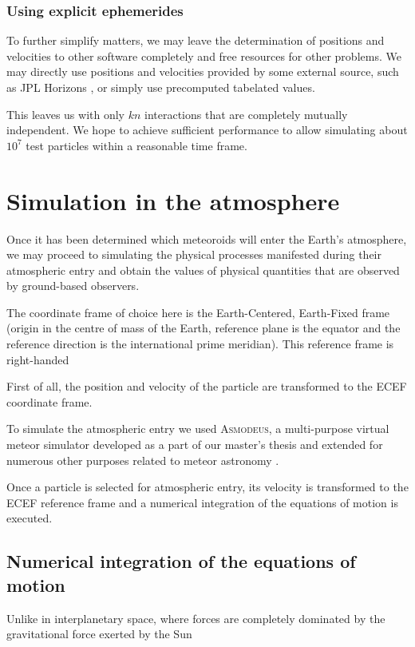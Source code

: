         \subsubsection{Using explicit ephemerides} \label{asie}
            To further simplify matters, we may leave the determination of positions and velocities
            to other software completely and free resources for other problems.
            We may directly use positions and velocities provided by some external source,
            such as JPL Horizons \cite{...}, or simply use precomputed tabelated values.

            This leaves us with only $kn$ interactions that are completely mutually independent.
            We hope to achieve sufficient performance to allow simulating about $10^7$ test particles within
            a reasonable time frame.

\section{Simulation in the atmosphere} \label{aa}
    Once it has been determined which meteoroids will enter the Earth's atmosphere, we may proceed to simulating
    the physical processes manifested during their atmospheric entry and obtain the values of physical quantities
    that are observed by ground-based observers.

    The coordinate frame of choice here is the Earth-Centered, Earth-Fixed frame (origin in the centre of mass of the Earth,
    reference plane is the equator and the reference direction is the international prime meridian).
    This reference frame is right-handed

    First of all, the position and velocity of the particle are transformed to the ECEF coordinate frame.

    To simulate the atmospheric entry we used \textsc{Asmodeus},
    a multi-purpose virtual meteor simulator developed as a part of our master's thesis and extended for numerous
    other purposes related to meteor astronomy \citep{balaz-thesis,balaz+2020}.

    Once a particle is selected for atmospheric entry, its velocity is transformed to the ECEF reference frame
    and a numerical integration of the equations of motion is executed.

    \subsection{Numerical integration of the equations of motion} \label{aai}
        Unlike in interplanetary space, where forces are completely dominated by the gravitational force
        exerted by the Sun

